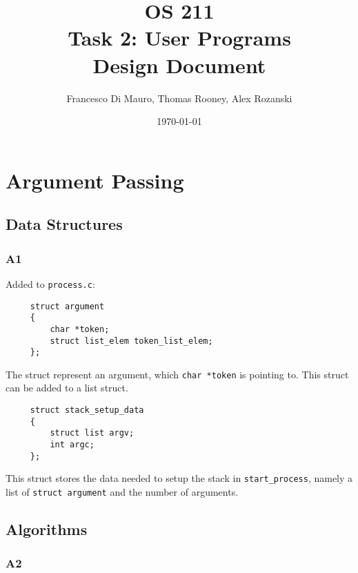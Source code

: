 \documentclass[a4wide, 11pt]{article}
\newcommand{\tab}{\hspace*{2em}}
\newcommand{\tx}{\texttt}
\begin{document}
\title{OS 211 \\ Task 2: User Programs \\ Design Document}
\author{Francesco Di Mauro, Thomas Rooney, Alex Rozanski}
\date{\today}
\maketitle

\section{Argument Passing}
\subsection{Data Structures}
\subsubsection{A1}
Added to \tx{process.c}:
\tab \begin{verbatim}
     struct argument
     {
         char *token;
         struct list_elem token_list_elem;
     };
\end{verbatim}
\tab The struct represent an argument, which \tx{char *token} is pointing to. This struct can be added to a list struct.
\\
\tab \begin{verbatim}
     struct stack_setup_data
     {
         struct list argv;
         int argc;
     };
\end{verbatim}
This struct stores the data needed to setup the stack in \tx{start\_process}, namely a list of \tx{struct argument} and the number of arguments. 

\subsection{Algorithms}
\subsubsection{A2}
\end{document}
